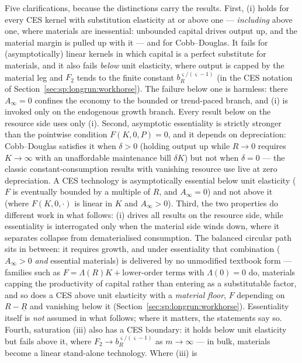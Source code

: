 Five clarifications, because the distinctions carry the results. First, (i) holds for every CES
kernel with substitution elasticity at or above one --- \emph{including} above one, where
materials are inessential: unbounded capital drives output up, and the material margin is
pulled up with it --- and for Cobb--Douglas. It fails for (asymptotically) linear kernels
in which capital is a perfect substitute for materials, and it also fails \emph{below} unit
elasticity, where output is capped by the material leg and $F_2$ tends to the finite constant
$b_R^{\varsigma/\left(\varsigma-1\right)}$ (in the CES notation of
Section~\ref{sec:sp:longrun:workhorse}). The failure below one is harmless: there $A_\infty=0$
confines the economy to the bounded or trend-paced branch, and (i) is invoked only on the
endogenous growth branch.
Every result below on the resource side uses only (i). Second, asymptotic essentiality is
strictly stronger than the pointwise condition $F\left(K,0,P\right)=0$, and it depends on
depreciation: Cobb--Douglas satisfies it when $\delta>0$ (holding output up while $R\to0$
requires $K\to\infty$ with an unaffordable maintenance bill $\delta K$) but not when $\delta=0$
--- the classic constant-consumption results with vanishing resource use live at zero
depreciation. A CES technology is asymptotically essential below unit elasticity ($F$ is
eventually bounded by a multiple of $R$, and $A_\infty=0$) and not above it (where
$F\left(K,0,\cdot\right)$ is linear in $K$ and $A_\infty>0$). Third, the two properties do
different work in what follows: (i) drives all results on the resource side, while essentiality
is interrogated only when the material side winds down, where it separates collapse from
dematerialised consumption. The balanced circular path sits in between: it requires growth, and
under essentiality that combination ($A_\infty>0$ \emph{and} essential materials) is delivered
by no unmodified textbook form --- families such as $F=\Lambda\left(R\right)K+\text{lower-order terms}$ with
$\Lambda(0)=0$ do, materials capping the productivity of capital rather than entering as a
substitutable factor, and so does a CES above unit elasticity with a \emph{material floor},
$F$ depending on $R-\underline R$ and vanishing below it
(Section~\ref{sec:sp:longrun:workhorse}). Essentiality itself is \emph{not} assumed in what follows; where it
matters, the statements say so. Fourth, saturation (iii) also has a CES boundary: it holds
below unit elasticity but fails above it, where $F_2\to b_R^{\varsigma/\left(\varsigma-1\right)}$
as $m\to\infty$ --- in bulk, materials become a linear stand-alone technology. Where (iii) is
